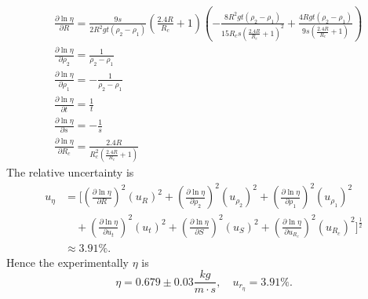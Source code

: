     \[
    \begin{split}
        &\frac{\partial\ln\eta}{\partial R}=\frac{9 s}{2 R^{2} g t \left(\rho_{2} - \rho_{1}\right)} \left(\frac{2.4 R}{R_{c}} + 1\right) \left(- \frac{8 R^{2} g t \left(\rho_{2} - \rho_{1}\right)}{15R_{c} s \left(\frac{2.4 R}{R_{c}} + 1\right)^{2}} + \frac{4 R g t \left(\rho_{2} - \rho_{1}\right)}{9s \left(\frac{2.4 R}{R_{c}} + 1\right)}\right)\\
        &\frac{\partial\ln\eta}{\partial \rho_2}=\frac{1}{\rho_2-\rho_1}\\
        &\frac{\partial\ln\eta}{\partial \rho_1}=-\frac{1}{\rho_2-\rho_1}\\
        &\frac{\partial\ln\eta}{\partial t}=\frac{1}{t}\\
        &\frac{\partial\ln\eta}{\partial s}=-\frac{1}{s}\\
        &\frac{\partial\ln\eta}{\partial R_c}=\frac{2.4 R}{R_{c}^{2} \left(\frac{2.4 R}{R_{c}} + 1\right)}
    \end{split}
    \]
    The relative uncertainty is
    \[
    \begin{split}
        u_{\eta}&=[(\frac{\partial\ln\eta}{\partial R})^2(u_R)^2+(\frac{\partial\ln\eta}{\partial \rho_2})^2(u_{\rho_2})^2+(\frac{\partial\ln\eta}{\partial \rho_1})^2(u_{\rho_1})^2\\
        &\quad+(\frac{\partial\ln\eta}{\partial u_t})^2(u_t)^2+(\frac{\partial\ln\eta}{\partial S})^2(u_S)^2+(\frac{\partial\ln\eta}{\partial u_{R_c}})^2(u_{R_c})^2]^\frac{1}{2}\\
        &\approx 3.91\%.
    \end{split}
    \]
    Hence the experimentally $\eta$ is
    \[
        \eta=0.679\pm 0.03\frac{kg}{m\cdot s}, \quad u_{r_{\eta}}=3.91\%.
    \]
